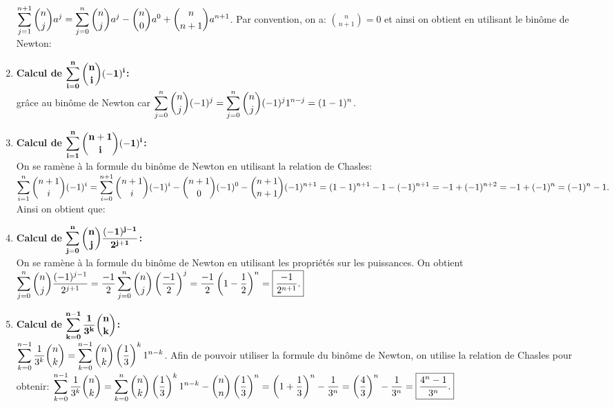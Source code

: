 \documentclass[a4paper, 11pt,reqno]{article}
\begin{document}
\begin{correction}
\begin{enumerate}
$\displaystyle \sum\limits_{j=1}^{n+1}\displaystyle \binom{n}{j}a^j=\displaystyle \sum\limits_{j=0}^{n}\displaystyle \binom{n}{j}a^j-\binom{n}{0}a^0+\binom{n}{n+1}a^{n+1}$. Par convention, on a: $\binom{n}{n+1}=0$ et ainsi on obtient en utilisant le bin\^{o}me de Newton: 
\item  \textbf{Calcul de $\mathbf{\displaystyle \sum\limits_{i=0}^{n}\displaystyle \binom{n}{i}(-1)^{i}}$:}\\
\noindent \noindent {} gr\^ace au bin\^{o}me de Newton car $\displaystyle \sum\limits_{j=0}^n\binom{n}{j}(-1)^j=\displaystyle \sum\limits_{j=0}^n\binom{n}{j}(-1)^j 1^{n-j}=(1-1)^n$.
\item  \textbf{Calcul de $\mathbf{\displaystyle \sum\limits_{i=1}^{n}\displaystyle \binom{n+1}{i}(-1)^{i}}$:}\\
\noindent On se ram\`{e}ne \`{a} la formule du bin\^{o}me de Newton en utilisant la relation de Chasles: 
$\displaystyle \sum\limits_{i=1}^{n}\displaystyle \binom{n+1}{i}(-1)^{i}=\displaystyle \sum\limits_{i=0}^{n+1}\displaystyle \binom{n+1}{i}(-1)^{i}-\displaystyle \binom{n+1}{0}(-1)^{0}-\displaystyle \binom{n+1}{n+1}(-1)^{n+1}=(1-1)^{n+1}-1-(-1)^{n+1}=-1+(-1)^{n+2}=-1+(-1)^n=(-1)^n-1.$ Ainsi on obtient que: 
\item  \textbf{Calcul de $\mathbf{\displaystyle \sum\limits_{j=0}^n\displaystyle \binom{n}{j}  \displaystyle\frac{(-1)^{j-1}}{2^{j+1}}}$:}\\
\noindent On se ram\`{e}ne \`{a} la formule du bin\^{o}me de Newton en utilisant les propri\'et\'es sur les puissances. On obtient
$\displaystyle \sum\limits_{j=0}^n\displaystyle \binom{n}{j}  \displaystyle\frac{(-1)^{j-1}}{2^{j+1}}=\displaystyle\frac{-1}{2}\displaystyle \sum\limits_{j=0}^n\displaystyle \binom{n}{j} \left( \displaystyle\frac{-1}{2}\right)^j=\displaystyle\frac{-1}{2} \left(  1-\displaystyle\frac{1}{2} \right)^n=\fbox{$ \displaystyle\frac{-1}{2^{n+1}}  $.}$
\item  \textbf{Calcul de $\mathbf{\displaystyle \sum\limits_{k=0}^{n-1} \displaystyle\frac{1}{3^k}\displaystyle \binom{n}{k}}$:}\\
\noindent $\displaystyle \sum\limits_{k=0}^{n-1} \displaystyle\frac{1}{3^k}\binom{n}{k}=\displaystyle \sum\limits_{k=0}^{n-1}\binom{n}{k}\left( \displaystyle\frac{1}{3}\right)^k1^{n-k}$. Afin de pouvoir utiliser la formule du bin\^{o}me de Newton, on utilise la relation de Chasles pour obtenir:
$\displaystyle \sum\limits_{k=0}^{n-1} \displaystyle\frac{1}{3^k}\binom{n}{k}=\displaystyle \sum\limits_{k=0}^{n}\binom{n}{k}\left( \displaystyle\frac{1}{3}\right)^k1^{n-k}-\binom{n}{n}\left( \displaystyle\frac{1}{3}\right)^n=\left( 1+\displaystyle\frac{1}{3} \right)^n- \displaystyle\frac{1}{3^n}=\left(\displaystyle\frac{4}{3} \right)^n- \displaystyle\frac{1}{3^n}=\fbox{$\displaystyle\frac{4^n-1}{3^n}.$}$
\end{enumerate}
\end{correction}
\end{document}
